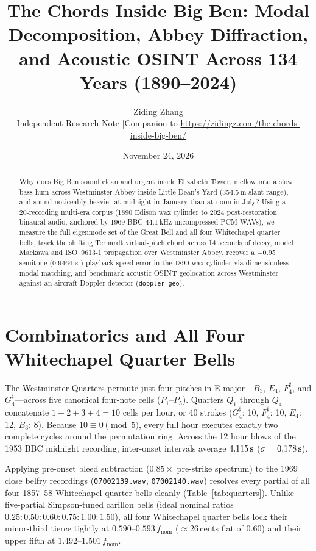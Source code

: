 \documentclass[11pt,a4paper]{article}
\title{\textbf{The Chords Inside Big Ben: Modal Decomposition, Abbey Diffraction, and Acoustic OSINT Across 134 Years (1890--2024)}}
\author{Ziding Zhang\\
\small Independent Research Note \quad|\quad Companion to \url{https://zidingz.com/the-chords-inside-big-ben/}}
\date{November 24, 2026}
\begin{document}
\maketitle

\begin{abstract}
Why does Big Ben sound clean and urgent inside Elizabeth Tower, mellow into a slow bass hum across Westminster Abbey inside Little Dean's Yard (354.5\,m slant range), and sound noticeably heavier at midnight in January than at noon in July? Using a 20-recording multi-era corpus (1890 Edison wax cylinder to 2024 post-restoration binaural audio, anchored by 1969 BBC 44.1\,kHz uncompressed PCM WAVs), we measure the full eigenmode set of the Great Bell and all four Whitechapel quarter bells, track the shifting Terhardt virtual-pitch chord across 14 seconds of decay, model Maekawa and ISO~9613-1 propagation over Westminster Abbey, recover a $-0.95$\,semitone ($0.9464\times$) playback speed error in the 1890 wax cylinder via dimensionless modal matching, and benchmark acoustic OSINT geolocation across Westminster against an aircraft Doppler detector (\texttt{doppler-geo}).
\end{abstract}

\section{Combinatorics and All Four Whitechapel Quarter Bells}
The Westminster Quarters permute just four pitches in E major---$B_3$, $E_4$, $F^\sharp_4$, and $G^\sharp_4$---across five canonical four-note cells ($P_1$--$P_5$). Quarters $Q_1$ through $Q_4$ concatenate $1+2+3+4 = 10$ cells per hour, or 40 strokes ($G^\sharp_4$: 10, $F^\sharp_4$: 10, $E_4$: 12, $B_3$: 8). Because $10 \equiv 0 \pmod 5$, every full hour executes exactly two complete cycles around the permutation ring. Across the 12 hour blows of the 1953 BBC midnight recording, inter-onset intervals average $4.115\text{\,s}$ ($\sigma = 0.178\text{\,s}$).

Applying pre-onset bleed subtraction ($0.85\times$ pre-strike spectrum) to the 1969 close belfry recordings (\texttt{07002139.wav}, \texttt{07002140.wav}) resolves every partial of all four 1857--58 Whitechapel quarter bells cleanly (Table~\ref{tab:quarters}). Unlike five-partial Simpson-tuned carillon bells (ideal nominal ratios $0.25 : 0.50 : 0.60 : 0.75 : 1.00 : 1.50$), all four Whitechapel quarter bells lock their minor-third tierce tightly at $0.590\text{--}0.593\,f_{\mathrm{nom}}$ ($\approx 26$\,cents flat of 0.60) and their upper fifth at $1.492\text{--}1.501\,f_{\mathrm{nom}}$.
\end{document}
